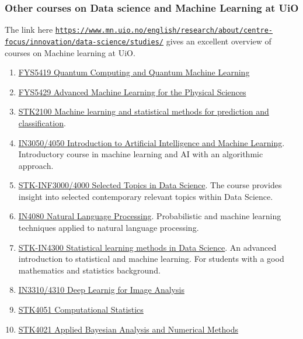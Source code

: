 \documentclass{beamer}
\begin{document}
\begin{frame}
\frametitle{Other courses on Data science and Machine Learning  at UiO}

The link here \href{{https://www.mn.uio.no/english/research/about/centre-focus/innovation/data-science/studies/}}{\nolinkurl{https://www.mn.uio.no/english/research/about/centre-focus/innovation/data-science/studies/}}  gives an excellent overview of courses on Machine learning at UiO.
\begin{enumerate}
\item \href{{https://www.uio.no/studier/emner/matnat/fys/FYS5419/index-eng.html}}{FYS5419 Quantum Computing and Quantum Machine Learning}

\item \href{{https://www.uio.no/studier/emner/matnat/fys/FYS5429/index-eng.html}}{FYS5429 Advanced Machine Learning for the Physical Sciences}

\item \href{{http://www.uio.no/studier/emner/matnat/math/STK2100/index-eng.html}}{STK2100 Machine learning and statistical methods for prediction and classification}. 

\item \href{{https://www.uio.no/studier/emner/matnat/ifi/IN3050/index-eng.html}}{IN3050/4050 Introduction to Artificial Intelligence and Machine Learning}. Introductory course in machine learning and AI with an algorithmic approach. 

\item \href{{http://www.uio.no/studier/emner/matnat/math/STK-INF3000/index-eng.html}}{STK-INF3000/4000 Selected Topics in Data Science}. The course provides insight into selected contemporary relevant topics within Data Science. 

\item \href{{https://www.uio.no/studier/emner/matnat/ifi/IN4080/index.html}}{IN4080 Natural Language Processing}. Probabilistic and machine learning techniques applied to natural language processing. 

\item \href{{https://www.uio.no/studier/emner/matnat/math/STK-IN4300/index-eng.html}}{STK-IN4300 Statistical learning methods in Data Science}. An advanced introduction to statistical and machine learning. For students with a good mathematics and statistics background.

\item \href{{https://www.uio.no/studier/emner/matnat/ifi/IN4310/index.html}}{IN3310/4310 Deep Learnig for Image Analysis}

\item \href{{https://www.uio.no/studier/emner/matnat/math/STK4051/index-eng.html}}{STK4051 Computational Statistics}

\item \href{{https://www.uio.no/studier/emner/matnat/math/STK4021/index-eng.html}}{STK4021 Applied Bayesian Analysis and Numerical Methods}
\end{enumerate}

\noindent
\end{frame}
\end{document}
